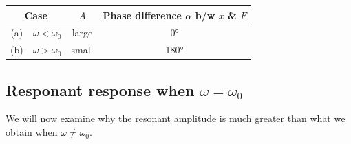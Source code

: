 \begin{center}
\begin{tabular}{cccc}
	\hline
	\multicolumn{2}{c}{Case} & $A$ & \parbox{3cm}{\centering Phase difference $\alpha$ b/w $x$ \& $F$}  \\
	\hline\hline
	(a) & $\omega < \omega_0$ & large & 0° \\
	(b) & $\omega > \omega_0$ & small & 180° \\
	\hline
\end{tabular}
\end{center}


\subsection{Responant response when $\omega = \omega_0$}

We will now examine why the resonant amplitude is much greater than what we obtain when $\omega\neq \omega_0$.

